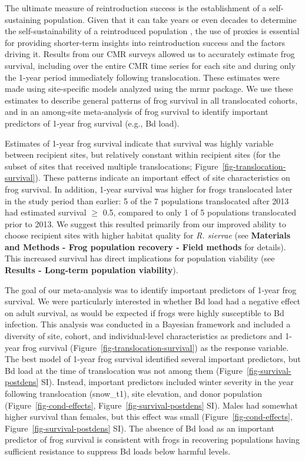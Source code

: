 \documentclass[
  letterpaper,
  DIV=11,
  numbers=noendperiod]{scrartcl}
\begin{document}
The ultimate measure of reintroduction success is the establishment of a
self-sustaining population. Given that it can take years or even decades
to determine the self-sustainability of a reintroduced population
\citep[for an example in MYL frogs, see][]{joseph2018}, the use of
proxies is essential for providing shorter-term insights into
reintroduction success and the factors driving it. Results from our CMR
surveys allowed us to accurately estimate frog survival, including over
the entire CMR time series for each site and during only the 1-year
period immediately following translocation. These estimates were made
using site-specific models analyzed using the mrmr package. We use these
estimates to describe general patterns of frog survival in all
translocated cohorts, and in an among-site meta-analysis of frog
survival to identify important predictors of 1-year frog survival (e.g.,
Bd load).

Estimates of 1-year frog survival indicate that survival was highly
variable between recipient sites, but relatively constant within
recipient sites (for the subset of sites that received multiple
translocations; Figure~\ref{fig-translocation-survival}). These patterns
indicate an important effect of site characteristics on frog survival.
In addition, 1-year survival was higher for frogs translocated later in
the study period than earlier: 5 of the 7 populations translocated after
2013 had estimated survival \(\ge\) 0.5, compared to only 1 of 5
populations translocated prior to 2013. We suggest this resulted
primarily from our improved ability to choose recipient sites with
higher habitat quality for \emph{R. sierrae} (see \textbf{Materials and
Methods - Frog population recovery - Field methods} for details). This
increased survival has direct implications for population viability (see
\textbf{Results - Long-term population viability}).

The goal of our meta-analysis was to identify important predictors of
1-year frog survival. We were particularly interested in whether Bd load
had a negative effect on adult survival, as would be expected if frogs
were highly susceptible to Bd infection. This analysis was conducted in
a Bayesian framework and included a diversity of site, cohort, and
individual-level characteristics as predictors and 1-year frog survival
(Figure~\ref{fig-translocation-survival}) as the response variable. The
best model of 1-year frog survival identified several important
predictors, but Bd load at the time of translocation was not among them
(Figure~\ref{fig-survival-postdens} SI). Instead, important predictors
included winter severity in the year following translocation (snow\_t1),
site elevation, and donor population (Figure~\ref{fig-cond-effects},
Figure~\ref{fig-survival-postdens} SI). Males had somewhat higher
survival than females, but this effect was small
(Figure~\ref{fig-cond-effects}, Figure~\ref{fig-survival-postdens} SI).
The absence of Bd load as an important predictor of frog survival is
consistent with frogs in recovering populations having sufficient
resistance to suppress Bd loads below harmful levels.
\end{document}
